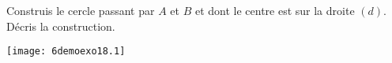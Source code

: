 Construis le cercle passant par $A$ et $B$ et dont le centre est sur
la droite $(d)$. Décris la construction.
\begin{center}
\texttt{[image: 6demoexo18.1]}
\end{center}